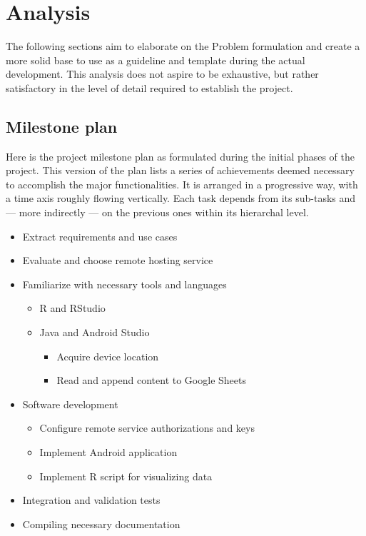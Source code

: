 \chapter{Analysis}
The following sections aim to elaborate on the Problem formulation and create a more solid base to use as a guideline and template during the actual development.
This analysis does not aspire to be exhaustive, but rather satisfactory in the level of detail required to establish the project.


\section{Milestone plan}
Here is the project milestone plan as formulated during the initial phases of the project.
This version of the plan lists a series of achievements deemed necessary to accomplish the major functionalities.
It is arranged in a progressive way, with a time axis roughly flowing vertically.
Each task depends from its sub-tasks and --- more indirectly --- on the previous ones within its hierarchal level.


\renewcommand{\labelitemi}{\textbullet}
\renewcommand{\labelitemii}{\textbullet}
\renewcommand{\labelitemiii}{\textbullet}
\renewcommand{\labelitemiv}{\textbullet}
\begin{itemize}
	\setlength\itemsep{0em}
	\item Extract requirements and use cases
	\item Evaluate and choose remote hosting service
	\item Familiarize with necessary tools and languages
	\begin{itemize}
		\item R and RStudio
		\item Java and Android Studio
		\begin{itemize}
			\item Acquire device location
			\item Read and append content to Google Sheets
		\end{itemize}
	\end{itemize}
	\item Software development
	\begin{itemize}
		\item Configure remote service authorizations and keys
		\item Implement Android application
		\item Implement R script for visualizing data
	\end{itemize}
	\item Integration and validation tests
	\item Compiling necessary documentation
\end{itemize}



